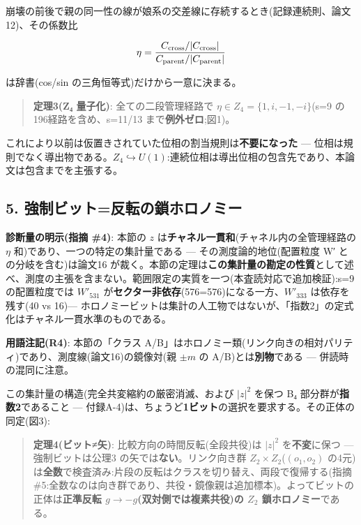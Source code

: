 \documentclass[
]{ltjsarticle}
\begin{document}
崩壊の前後で親の同一性の線が娘系の交差線に存続するとき(記録連続則、論文12)、その係数比

\[
\eta=\frac{C_{\rm cross}/|C_{\rm cross}|}{C_{\rm parent}/|C_{\rm parent}|}
\]

は辞書(cos/sin の三角恒等式)だけから一意に決まる。

\begin{quote}
\textbf{定理3(Z₄ 量子化)}: 全ての二段管理経路で
\(\eta\in Z_4=\{1,i,-1,-i\}\)(s=9 の196経路を含め、s=11/13
まで\textbf{例外ゼロ};図1)。
\end{quote}

これにより以前は仮置きされていた位相の割当規則は\textbf{不要になった}
---
位相は規則でなく導出物である。\(Z_4\hookrightarrow U(1)\):連続位相は導出位相の包含先であり、本論文は包含までを主張する。

\subsection{5.
強制ビット=反転の鎖ホロノミー}\label{ux5f37ux5236ux30d3ux30c3ux30c8ux53cdux8ee2ux306eux9396ux30dbux30edux30ceux30dfux30fc}

\textbf{診断量の明示(指摘 \#4)}: 本節の \(z\)
は\textbf{チャネル一貫和}(チャネル内の全管理経路の \(\eta\)
和)であり、一つの特定の集計量である --- その測度論的地位(配置粒度 W′
との分岐を含む)は論文16
が裁く。本節の定理は\textbf{この集計量の勘定の性質}として述べ、測度の主張を含まない。範囲限定の実質を一つ(本査読対応で追加検証):s=9
の配置粒度では \(W'_{531}\)
が\textbf{セクター非依存}(576=576)になる一方、\(W'_{333}\)
は依存を残す(40 vs 16)---
ホロノミービットは集計の人工物ではないが、「指数2」の定式化はチャネル一貫水準のものである。

\textbf{用語注記(R4)}: 本節の「クラス
A/B」はホロノミー類(リンク向きの相対パリティ)であり、測度線(論文16)の鏡像対(親
\(\pm m\) の A/B)とは\textbf{別物}である --- 併読時の混同に注意。

この集計量の構造(完全共変縮約の厳密消滅、および \(|z|^2\) を保つ B₄
部分群が\textbf{指数2}であること ---
付録A-4)は、ちょうど\textbf{1ビット}の選択を要求する。その正体の同定(図3):

\begin{quote}
\textbf{定理4(ビット≠矢)}: 比較方向の時間反転(全段共役)は \(|z|^2\)
を\textbf{不変}に保つ --- 強制ビットは公理3
の矢では\textbf{ない}。リンク向き群 \(Z_2\times Z_2\)(\((o_1,o_2)\)
の4元)は\textbf{全数}で検査済み:片段の反転はクラスを切り替え、両段で復帰する(指摘
\#5:全数なのは向き群であり、共役・鏡像親は追加標本)。よってビットの正体は\textbf{正準反転
\(g\to-g\)(双対側では複素共役)の \(Z_2\) 鎖ホロノミー}である。
\end{quote}
\end{document}
